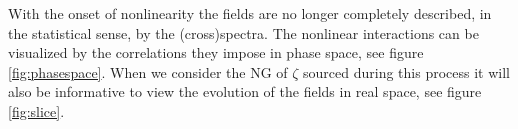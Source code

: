 
With the onset of nonlinearity the fields are no longer completely described, in the statistical sense, by the (cross)spectra.
The nonlinear interactions can be visualized by the correlations they impose in phase space, see figure \ref{fig:phasespace}.
When we consider the NG of $\zeta$ sourced during this process it will also be informative to view the evolution of the fields in real space, see figure \ref{fig:slice}.

